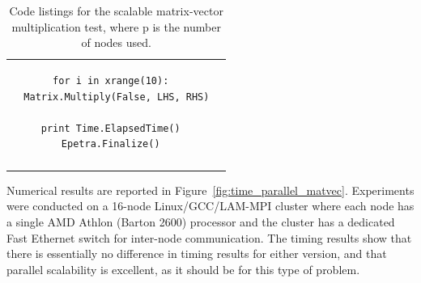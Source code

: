 \documentclass[acmtocl]{acmtrans2m}
\begin{document}
\begin{table}
\begin{tabular}{| c  | c|}
\begin{minipage}{10.5cm}
\begin{verbatim}
for i in xrange(10):
  Matrix.Multiply(False, LHS, RHS)

print Time.ElapsedTime()
Epetra.Finalize()
\end{verbatim}
    \end{minipage}
    \\
    &  \\
    \hline
  \end{tabular}
  \caption{Code listings for the scalable matrix-vector multiplication test, where p is the number of nodes used.}
  \label{tab:code_parallel_matvec}
\end{table}

Numerical results are reported in
Figure~\ref{fig:time_parallel_matvec}. Experiments were conducted on
a 16-node Linux/GCC/LAM-MPI cluster where each node has a single AMD
Athlon (Barton 2600) processor and the cluster has a dedicated Fast
Ethernet switch for inter-node communication. The timing results
show that there is essentially no difference in timing results for
either version, and that parallel scalability is excellent, as it
should be for this type of problem.

\end{document}
